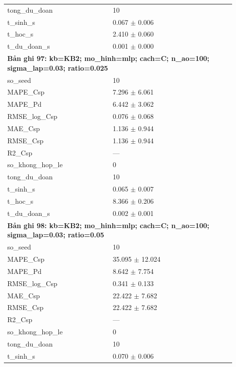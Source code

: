\begin{longtable}{p{0.43\linewidth}p{0.50\linewidth}}
tong\_\allowbreak du\_\allowbreak doan & 10 \\
t\_\allowbreak sinh\_\allowbreak s & 0.067 $\pm$ 0.006 \\
t\_\allowbreak hoc\_\allowbreak s & 2.410 $\pm$ 0.060 \\
t\_\allowbreak du\_\allowbreak doan\_\allowbreak s & 0.001 $\pm$ 0.000 \\
\midrule
\multicolumn{2}{p{0.95\linewidth}}{\textbf{Bản ghi 97: kb=KB2; mo\_hinh=mlp; cach=C; n\_ao=100; sigma\_lap=0.03; ratio=0.025}} \\
so\_\allowbreak seed & 10 \\
MAPE\_\allowbreak Csp & 7.296 $\pm$ 6.061 \\
MAPE\_\allowbreak Pd & 6.442 $\pm$ 3.062 \\
RMSE\_\allowbreak log\_\allowbreak Csp & 0.076 $\pm$ 0.068 \\
MAE\_\allowbreak Csp & 1.136 $\pm$ 0.944 \\
RMSE\_\allowbreak Csp & 1.136 $\pm$ 0.944 \\
R2\_\allowbreak Csp & — \\
so\_\allowbreak khong\_\allowbreak hop\_\allowbreak le & 0 \\
tong\_\allowbreak du\_\allowbreak doan & 10 \\
t\_\allowbreak sinh\_\allowbreak s & 0.065 $\pm$ 0.007 \\
t\_\allowbreak hoc\_\allowbreak s & 8.366 $\pm$ 0.206 \\
t\_\allowbreak du\_\allowbreak doan\_\allowbreak s & 0.002 $\pm$ 0.001 \\
\midrule
\multicolumn{2}{p{0.95\linewidth}}{\textbf{Bản ghi 98: kb=KB2; mo\_hinh=mlp; cach=C; n\_ao=100; sigma\_lap=0.03; ratio=0.05}} \\
so\_\allowbreak seed & 10 \\
MAPE\_\allowbreak Csp & 35.095 $\pm$ 12.024 \\
MAPE\_\allowbreak Pd & 8.642 $\pm$ 7.754 \\
RMSE\_\allowbreak log\_\allowbreak Csp & 0.341 $\pm$ 0.133 \\
MAE\_\allowbreak Csp & 22.422 $\pm$ 7.682 \\
RMSE\_\allowbreak Csp & 22.422 $\pm$ 7.682 \\
R2\_\allowbreak Csp & — \\
so\_\allowbreak khong\_\allowbreak hop\_\allowbreak le & 0 \\
tong\_\allowbreak du\_\allowbreak doan & 10 \\
t\_\allowbreak sinh\_\allowbreak s & 0.070 $\pm$ 0.006 \\

\end{longtable}
